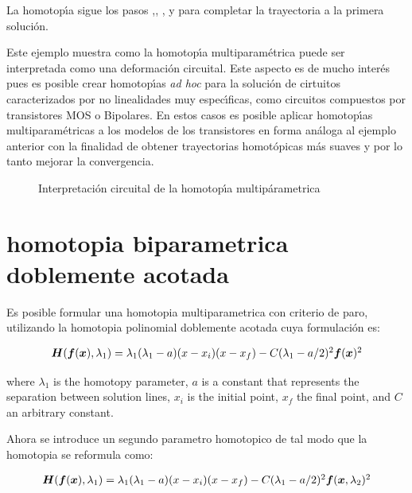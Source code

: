 \documentclass[conference,letterpaper,onecolumn]{IEEEtran}
\newcommand{\pig}[1]{\mbox{\boldmath ${#1}$}	}
\begin{document}
La homotop\'{\i}a sigue los pasos ,, ,  y   para completar la trayectoria a la primera soluci\'on.

Este ejemplo muestra como la homotop\'{\i}a multiparam\'etrica puede ser interpretada
como una deformaci\'on circuital. Este aspecto es de mucho inter\'es pues es posible
crear homotop\'{\i}as {\it ad hoc} para la soluci\'on de cirtuitos caracterizados
por no linealidades muy espec\'{\i}ficas, como circuitos compuestos por transistores MOS o Bipolares.
En estos casos es posible aplicar homotop\'{\i}as multiparam\'etricas a los modelos
de los transistores en forma an\'aloga al ejemplo anterior con la finalidad
de obtener trayectorias homot\'opicas m\'as suaves y por lo tanto mejorar la convergencia.


\begin{figure}[hbtp]
\centerline{
\epsfxsize=11cm
}
\caption{Interpretaci\'on circuital de la homotop\'{\i}a multip\'arametrica }
\label{homos}
\end{figure}

\section{homotopia biparametrica doblemente acotada}

Es posible formular una homotopia multiparametrica con criterio de paro, utilizando
la homotopia polinomial doblemente acotada cuya formulación es:

\begin{equation}
{\small
\begin{array}{l}
\pig{H}(\pig{f}(\pig{x}),\lambda_1 )=\lambda_1(\lambda_1-a)(x-x_i)(x-x_f) -C(\lambda_1-a/2)^2 \pig{f}(\pig{x})^2
\end{array}}
\label{homotopiaP}
\end{equation}

where $\lambda_1$ is the homotopy parameter, $a$ is a constant that represents the separation between solution lines, $x_i$ is the initial point, $x_f$ the final point, and $C$ an arbitrary constant.


Ahora se introduce un segundo parametro homotopico de tal modo que la homotopia se reformula como:

\begin{equation}
{\small
\begin{array}{l}
\pig{H}(\pig{f}(\pig{x}),\lambda_1 )=\lambda_1(\lambda_1-a)(x-x_i)(x-x_f) -C(\lambda_1-a/2)^2 \pig{f}(\pig{x},\lambda_2)^2
\end{array}}
\label{homotopiaPx1}
\end{equation}
\end{document}
